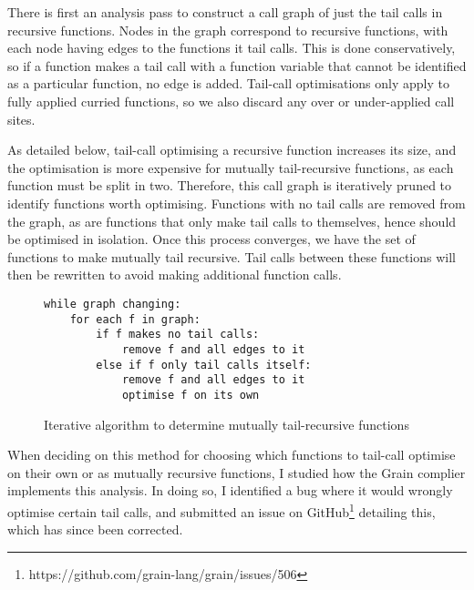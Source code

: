 There is first an analysis pass to construct a call graph of just the tail calls in recursive functions. Nodes in the graph correspond to recursive functions, with each node having edges to the functions it tail calls. This is done conservatively, so if a function makes a tail call with a function variable that cannot be identified as a particular function, no edge is added.  Tail-call optimisations only apply to fully applied curried functions, so we also discard any over or under-applied call sites.



As detailed below, tail-call optimising a recursive function increases its size, and the optimisation is more expensive for mutually tail-recursive functions, as each function must be split in two. Therefore, this call graph is iteratively pruned to identify functions worth optimising. Functions with no tail calls are removed from the graph, as are functions that only make tail calls to themselves, hence should be optimised in isolation. Once this process converges, we have the set of functions to make mutually tail recursive. Tail calls between these functions will then be rewritten to avoid making additional function calls.



\begin{figure}[H]
\centering
\begin{BVerbatim}
while graph changing:
    for each f in graph:
        if f makes no tail calls:
            remove f and all edges to it
        else if f only tail calls itself:
            remove f and all edges to it
            optimise f on its own
\end{BVerbatim}
\caption{Iterative algorithm to determine mutually tail-recursive functions}
\end{figure}


When deciding on this method for choosing which functions to tail-call optimise on their own or as mutually recursive functions, I studied how the Grain complier implements this analysis. In doing so, I identified a bug where it would wrongly optimise certain tail calls, and submitted an issue on GitHub\footnote{https://github.com/grain-lang/grain/issues/506} detailing this, which has since been corrected. %

